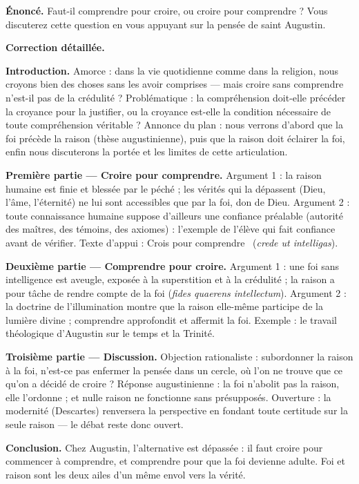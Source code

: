 \documentclass[11pt]{article}
\begin{document}
\begin{exoresolu}
\textbf{Énoncé.} Faut-il comprendre pour croire, ou croire pour comprendre ? Vous discuterez cette question en vous appuyant sur la pensée de saint Augustin.

\tcblower

\textbf{Correction détaillée.}

\textbf{Introduction.} Amorce : dans la vie quotidienne comme dans la religion, nous croyons bien des choses sans les avoir comprises — mais croire sans comprendre n'est-il pas de la crédulité ? Problématique : la compréhension doit-elle précéder la croyance pour la justifier, ou la croyance est-elle la condition nécessaire de toute compréhension véritable ? Annonce du plan : nous verrons d'abord que la foi précède la raison (thèse augustinienne), puis que la raison doit éclairer la foi, enfin nous discuterons la portée et les limites de cette articulation.

\textbf{Première partie — Croire pour comprendre.} Argument 1 : la raison humaine est finie et blessée par le péché ; les vérités qui la dépassent (Dieu, l'âme, l'éternité) ne lui sont accessibles que par la foi, don de Dieu. Argument 2 : toute connaissance humaine suppose d'ailleurs une confiance préalable (autorité des maîtres, des témoins, des axiomes) : l'exemple de l'élève qui fait confiance avant de vérifier. Texte d'appui : \guillemotleft Crois pour comprendre \guillemotright\ (\emph{crede ut intelligas}).

\textbf{Deuxième partie — Comprendre pour croire.} Argument 1 : une foi sans intelligence est aveugle, exposée à la superstition et à la crédulité ; la raison a pour tâche de rendre compte de la foi (\emph{fides quaerens intellectum}). Argument 2 : la doctrine de l'illumination montre que la raison elle-même participe de la lumière divine ; comprendre approfondit et affermit la foi. Exemple : le travail théologique d'Augustin sur le temps et la Trinité.

\textbf{Troisième partie — Discussion.} Objection rationaliste : subordonner la raison à la foi, n'est-ce pas enfermer la pensée dans un cercle, où l'on ne trouve que ce qu'on a décidé de croire ? Réponse augustinienne : la foi n'abolit pas la raison, elle l'ordonne ; et nulle raison ne fonctionne sans présupposés. Ouverture : la modernité (Descartes) renversera la perspective en fondant toute certitude sur la seule raison — le débat reste donc ouvert.

\textbf{Conclusion.} Chez Augustin, l'alternative est dépassée : il faut croire pour commencer à comprendre, et comprendre pour que la foi devienne adulte. Foi et raison sont les deux ailes d'un même envol vers la vérité.
\end{exoresolu}
\end{document}
